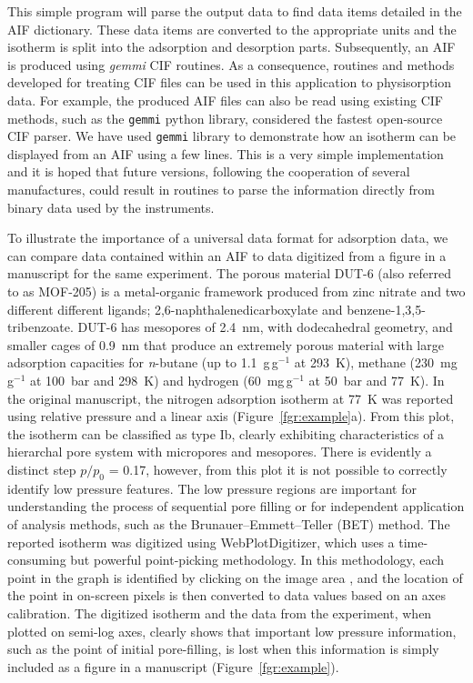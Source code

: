 \documentclass[journal=langd5,manuscript=article]{achemso}
\begin{document}
This simple program will parse the output data to find data items detailed in the AIF dictionary.
These data items are converted to the appropriate units and the isotherm is split into the adsorption and desorption parts.
Subsequently, an AIF is produced using \textit{gemmi} CIF routines.\cite{gemmi}
As a consequence, routines and methods developed for treating CIF files can be used in this application to physisorption data.
For example, the produced AIF files can also be read using existing CIF methods, such as the \texttt{gemmi} python library, considered the fastest open-source CIF parser.\cite{gemmi}
We have used \texttt{gemmi} library to demonstrate how an isotherm can be displayed from an AIF using a few lines.
This is a very simple implementation and it is hoped that future versions, following the cooperation of several manufactures, could result in routines to parse the information directly from binary data used by the instruments.

To illustrate the importance of a universal data format for adsorption data, we can compare data contained within an AIF to data digitized from a figure in a manuscript for the same experiment.
The porous material DUT-6 (also referred to as MOF-205) is a metal-organic framework produced from zinc nitrate and two different different ligands; 2,6-naphthalenedicarboxylate and benzene-1,3,5-tribenzoate.\cite{10.1002/anie.200904599}
DUT-6 has mesopores of 2.4~nm, with dodecahedral geometry, and smaller cages of 0.9~nm that produce an extremely porous material with large adsorption capacities for \textit{n}-butane (up to 1.1~g$\,$g$^{-1}$ at 293~K),  methane (230~mg$\,$g$^{-1}$ at 100~bar and 298~K) and hydrogen (60~mg$\,$g$^{-1}$ at 50~bar and 77~K).
In the original manuscript, the nitrogen adsorption isotherm at 77~K was reported using relative pressure and a linear axis (Figure~\ref{fgr:example}a).
From this plot, the isotherm can be classified  as  type  Ib, clearly exhibiting characteristics of a hierarchal pore system with micropores and mesopores.
There is evidently a distinct step $p/p_0$ = 0.17, however, from this plot it is not possible to correctly identify low pressure features.
The low pressure regions are important for understanding the process of sequential pore filling or for independent application of analysis methods, such as the Brunauer–Emmett–Teller (BET) method.\cite{10.1016/S0167-2991(07)80008-5}
The reported isotherm was digitized using WebPlotDigitizer, which uses a time-consuming but powerful point-picking methodology.\cite{webplotdigitizer}
In this methodology, each point in the graph is identified by clicking on the image area , and the location of the point in on-screen pixels is then converted to data values based on an axes calibration.
The digitized isotherm and the data from the experiment, when plotted on semi-log axes, clearly shows that important low pressure information, such as the point of initial pore-filling, is lost when this information is simply included as a figure in a manuscript (Figure~\ref{fgr:example}).
\end{document}
